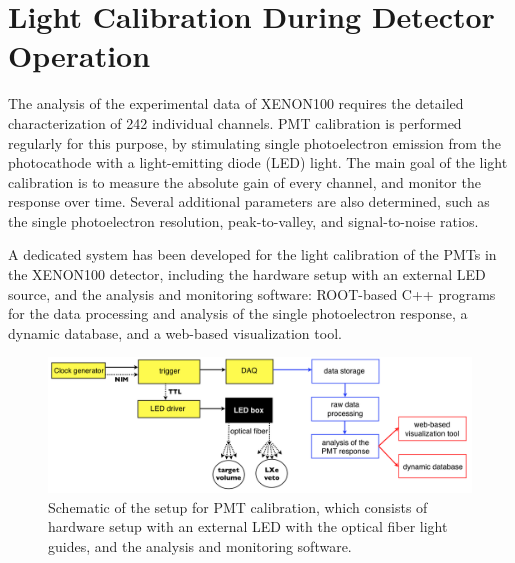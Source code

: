\section{Light Calibration During Detector Operation}
\label{secGainCalibration}


The analysis of the experimental data of XENON100 requires the detailed characterization of 242 individual channels. PMT calibration is performed regularly for this purpose, by stimulating single  photoelectron emission from the photocathode with a light-emitting diode (LED) light. The main goal of the light calibration is to measure the absolute gain of every channel, and monitor the response over time. Several additional parameters are also determined, such as the single photoelectron resolution, peak-to-valley, and signal-to-noise ratios.

A dedicated system has been developed for the light calibration of the PMTs in the XENON100 detector, including the hardware setup with an external LED source, and the analysis and monitoring software: ROOT-based C++ programs for the data processing and analysis of the single photoelectron response, a dynamic database, and a web-based visualization tool. 


\begin{figure}[!t]
\centering
\includegraphics[width=1.0\linewidth]{plots/PMTcalibration/CalibrationSchemeFull.png}
\caption[Schematic of the setup for PMT calibration]{Schematic of the setup for PMT calibration, which consists of hardware setup with an external LED with the optical fiber light guides, and the analysis and monitoring software.}
\label{figCalibrationSetup}
\end{figure}

